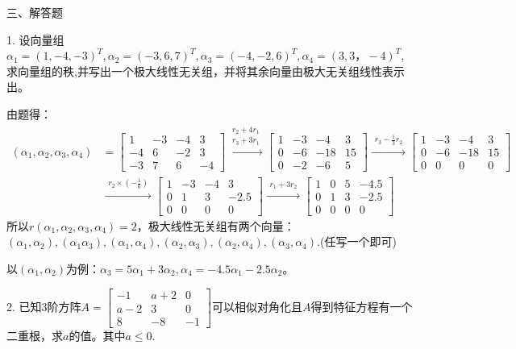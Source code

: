 \documentclass{article}
\begin{document}
三、解答题

1. 设向量组$\alpha_{1}=(1,-4,-3)^{T},\alpha_{2}=(-3,6,7)^{T},\alpha_{3}=(-4,-2,6)^{T},\alpha_{4}=(3,3，-4)^{T}$,求向量组的秩,并写出一个极大线性无关组，并将其余向量由极大无关组线性表示出。

\begin{jie}
由题得：
\begin{align*}
(\alpha_ {1},\alpha_{2},\alpha_{3},\alpha_{4})&=
\begin{bmatrix}
  1 & -3 & -4 & 3 \\
  -4 & 6 & -2 & 3\\
  -3 & 7 & 6 & -4
\end{bmatrix}
\xrightarrow{\substack{r_{2}+4r_1 \\ r_3+3r_1}}
{
\begin{bmatrix}
  1 & -3 & -4 & 3 \\
  0 & -6 & -18 & 15\\
  0 & -2 & -6 & 5
\end{bmatrix}
}
\xrightarrow{\substack{r_{3}-\frac{1}{3}r_2}}
{
\begin{bmatrix}
  1 & -3 & -4 & 3 \\
  0 & -6 & -18 & 15\\
  0 & 0 & 0 & 0
\end{bmatrix}
}\\ &\xrightarrow{\substack{r_{2}\times\left(-\frac{1}{6}\right)}}
{
\begin{bmatrix}
  1 & -3 & -4 & 3 \\
  0 & 1 & 3 & -2.5\\
  0 & 0 & 0 & 0
\end{bmatrix}
}
\xrightarrow{\substack{r_{1}+3r_2}}
{
\begin{bmatrix}
  1 & 0 & 5 & -4.5 \\
  0 & 1 & 3 & -2.5\\
  0 & 0 & 0 & 0
\end{bmatrix}
}
\end{align*}
所以$r(\alpha_ {1},\alpha_{2},\alpha_{3},\alpha_{4})=2$，极大线性无关组有两个向量：$(\alpha_ {1},\alpha_{2}),(\alpha_ {1}\alpha_{3}),(\alpha_ {1},\alpha_{4}),(\alpha_{2},\alpha_{3}),(\alpha_{2},\alpha_{4}),(\alpha_{3},\alpha_{4})$.\textcolor[rgb]{1.00,0.00,0.00}{(任写一个即可)}

以$(\alpha_ {1},\alpha_{2})$为例：$\alpha_3=5\alpha_1+3\alpha_2,\alpha_4=-4.5\alpha_1-2.5\alpha_2$。
\end{jie}

2. 已知3阶方阵$
A=
\begin{bmatrix}
  -1 & a+2 & 0\\
  a-2 & 3 & 0\\
 8 & -8 & -1
\end{bmatrix}
$可以相似对角化且$A$得到特征方程有一个二重根，求$a$的值。其中$a\leq 0$.
\end{document}

